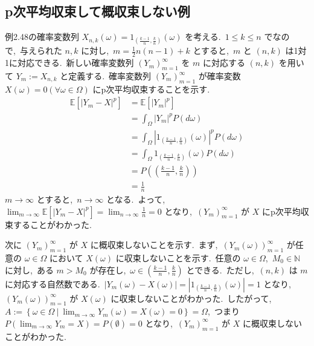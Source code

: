 \documentclass[a4j,11pt]{jarticle}
\theoremstyle{definition}
\begin{document}
\begin{comment}
  (2)十分性

  $\lim_{n\to\infty}F_{X_n} = F_X$
  と仮定する。
  $\pi$-$\lambda$定理より、
  $\lim_{n\to\infty}P_{X_n} = P_X$
  である。
  $A \in \mathcal{B}(\mathbb{R})$
  とする。
  $\lim_{n\to\infty} \int_\mathbb{R} 1_A(x) P_{X_n}(dx) = \lim_{n\to\infty} P_{X_n}(A)$,
  $\int_{\mathbb{R}} 1_A(x) P_X(dx) = P_X(A)$
  より、
  $\lim_{n\to\infty} \int_{\mathbb{R}} 1_A(x) P_{X_n}(dx) = \int_{\mathbb{R}} 1_A(x) P_X(dx)$
  とわかる。
\end{proof}

\end{comment}

\subsection{p次平均収束して概収束しない例}
例2.48の確率変数列
$X_{n,k}(\omega) = 1_{\left( \frac{k-1}{n},\frac{k}{n}\right)}(\omega)$
を考える.\ 
$1\leq k \leq n$
でなので,\ 与えられた
$n,k$
に対し,\ 
$m = \frac{1}{2}n(n-1)+k$
とすると,\ 
$m$
と
$(n,k)$
は1対1に対応できる.\ 
新しい確率変数列
$(Y_m)_{m=1}^{\infty}$
を
$m$
に対応する
$(n,k)$
を用いて
$Y_m:= X_{n,k}$
と定義する.\ 
確率変数列
$(Y_m)_{m=1}^\infty$
が確率変数
$X(\omega) = 0 (\forall \omega \in \Omega)$
にp次平均収束することを示す.\ 
\begin{align}
  \mathbb{E}[|Y_m-X|^p]
  & = \mathbb{E}[|Y_m|^p] \\
  & = \int_{\Omega} |Y_m|^p P(d\omega) \\
  & = \int_{\Omega} |1_{\left( \frac{k-1}{n}, \frac{k}{n}\right)}(\omega)|^p P(d\omega) \\
  & = \int_{\Omega} 1_{\left( \frac{k-1}{n}, \frac{k}{n}\right)}(\omega) P(d\omega)\\
  & = P\left( \left( \frac{k-1}{n}, \frac{k}{n}\right)\right) \\
  & = \frac{1}{n}
\end{align}
$m\to \infty$
とすると,\ 
$n\to \infty$
となる.\ 
よって,\ 
$\lim_{m\to \infty} \mathbb{E}[|Y_m-X|^p] = \lim_{n\to \infty}\frac{1}{n} = 0$
となり,\ 
$(Y_m)_{m=1}^{\infty}$
が
$X$
にp次平均収束することがわかった.\ 

次に
$(Y_m)_{m=1}^{\infty}$
が
$X$
に概収束しないことを示す.\ 
まず,\ 
$(Y_m(\omega))_{m=1}^{\infty}$
が任意の
$\omega \in \Omega$
において
$X(\omega)$
に収束しないことを示す.\ 
任意の
$\omega \in \Omega$,\ 
$M_0 \in \mathbb{N}$
に対し,\ ある
$m > M_0$
が存在し,\ 
$\omega \in \left( \frac{k-1}{n}, \frac{k}{n}\right)$
とできる.\ 
ただし,\ 
$(n,k)$
は
$m$
に対応する自然数である.\ 
$|Y_m(\omega) - X(\omega)| = |1_{\left( \frac{k-1}{n}, \frac{k}{n}\right)}(\omega)| = 1$
となり,\ 
$(Y_m(\omega))_{m=1}^{\infty}$
が
$X(\omega)$
に収束しないことがわかった.\ 
したがって,\ 
$A:= \left\{\omega \in \Omega \ | \ \lim_{m\to \infty}Y_m(\omega) = X(\omega) = 0 \right\} = \Omega$,\ 
つまり
$P(\lim_{m\to\infty}Y_m = X) = P(\emptyset) = 0$
となり,\ 
$(Y_m)_{m=1}^{\infty}$
が
$X$
に概収束しないことがわかった.\ 
\end{document}
